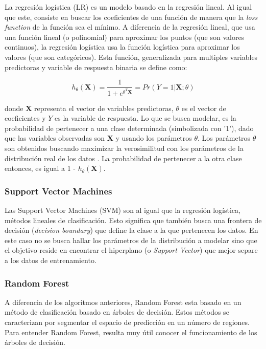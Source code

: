 La regresión logística (LR) es un modelo basado en la regresión lineal. Al igual que este, consiste en buscar los coeficientes de una función de manera que la \textit{loss function} de la función sea el mínimo. A diferencia de la regresión lineal, que usa una función lineal (o polinomial) para aproximar los puntos (que son valores continuos), la regresión logística usa la función logística para aproximar los valores (que son categóricos). Esta función, generalizada para multiples variables predictoras y variable de respuesta binaria se define como:

\begin{equation*}
h_{\theta}(\boldsymbol{X}) = \frac{1}{1 + e^{\theta^{T}\boldsymbol{X}}} = Pr(Y = 1 | \boldsymbol{X}; \theta)
\end{equation*}

donde $\boldsymbol{X}$ representa el vector de variables predictoras, $\theta$ es el vector de coeficientes y $Y$ es la variable de respuesta. Lo que se busca modelar, es la probabilidad de pertenecer a una clase determinada (simbolizada con '1'), dado que las variables observadas son $\boldsymbol{X}$ y usando los parámetros $\theta$. Los parámetros $\theta$ son obtenidos buscando maximizar la verosimilitud con los parámetros de la distribución real de los datos \cite{Hastie2001}. La probabilidad de pertenecer a la otra clase entonces, es igual a 1 - $h_{\theta}(\boldsymbol{X})$.

\subsubsection{Support Vector Machines}

Las Support Vector Machines (SVM) son al igual que la regresión logística, métodos lineales de clasificación. Esto significa que también busca una frontera de decisión (\textit{decision boundary}) que define la clase a la que pertenecen los datos. En este caso no se busca hallar los parámetros de la distribución a modelar sino que el objetivo reside en encontrar el hiperplano (o \textit{Support Vector}) que mejor separe a los datos de entrenamiento. 

\subsubsection{Random Forest}

A diferencia de los algoritmos anteriores, Random Forest esta basado en un método de clasificación basado en árboles de decisión. Estos métodos se caracterizan por segmentar el espacio de predicción en un número de regiones. Para entender Random Forest, resulta muy útil conocer el funcionamiento de los árboles de decisión. 

